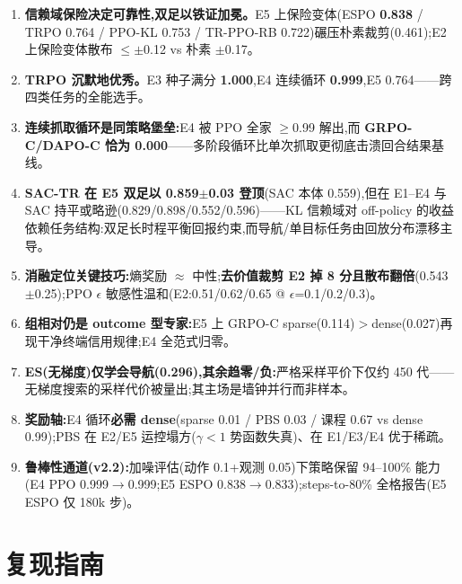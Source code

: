 \documentclass[11pt,a4paper]{ctexart}
\begin{document}
\begin{enumerate}
\item \textbf{信赖域保险决定可靠性,双足以铁证加冕。}E5 上保险变体(ESPO \textbf{0.838} / TRPO 0.764 / PPO-KL 0.753 / TR-PPO-RB 0.722)碾压朴素裁剪(0.461);E2 上保险变体散布 $\le\pm$0.12 vs 朴素 $\pm$0.17。
\item \textbf{TRPO 沉默地优秀。}E3 种子满分 \textbf{1.000},E4 连续循环 \textbf{0.999},E5 0.764——跨四类任务的全能选手。
\item \textbf{连续抓取循环是同策略堡垒:}E4 被 PPO 全家 $\ge$0.99 解出,而 \textbf{GRPO-C/DAPO-C 恰为 0.000}——多阶段循环比单次抓取更彻底击溃回合结果基线。
\item \textbf{SAC-TR 在 E5 双足以 0.859$\pm$0.03 登顶}(SAC 本体 0.559),但在 E1--E4 与 SAC 持平或略逊(0.829/0.898/0.552/0.596)——KL 信赖域对 off-policy 的收益依赖任务结构:双足长时程平衡回报约束,而导航/单目标任务由回放分布漂移主导。
\item \textbf{消融定位关键技巧:}熵奖励 $\approx$ 中性;\textbf{去价值裁剪 E2 掉 8 分且散布翻倍}(0.543$\pm$0.25);PPO $\epsilon$ 敏感性温和(E2:0.51/0.62/0.65 @ $\epsilon$=0.1/0.2/0.3)。
\item \textbf{组相对仍是 outcome 型专家:}E5 上 GRPO-C sparse(0.114)$>$dense(0.027)再现干净终端信用规律;E4 全范式归零。
\item \textbf{ES(无梯度)仅学会导航(0.296),其余趋零/负:}严格采样平价下仅约 450 代——无梯度搜索的采样代价被量出;其主场是墙钟并行而非样本。
\item \textbf{奖励轴:}E4 循环\textbf{必需 dense}(sparse 0.01 / PBS 0.03 / 课程 0.67 vs dense 0.99);PBS 在 E2/E5 运控塌方($\gamma<1$ 势函数失真)、在 E1/E3/E4 优于稀疏。
\item \textbf{鲁棒性通道(v2.2):}加噪评估(动作 0.1+观测 0.05)下策略保留 94--100\% 能力(E4 PPO 0.999$\to$0.999;E5 ESPO 0.838$\to$0.833);steps-to-80\% 全格报告(E5 ESPO 仅 180k 步)。
\end{enumerate}

\section{复现指南}
\end{document}
